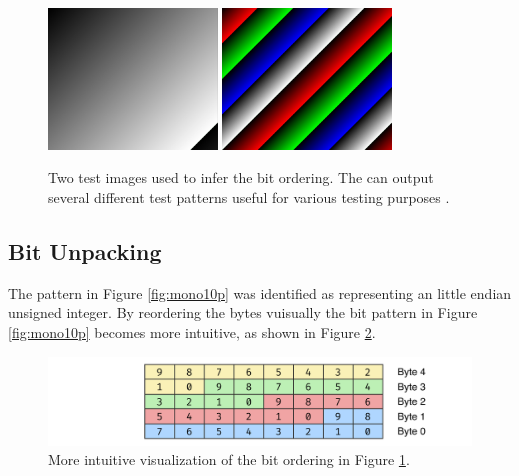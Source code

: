 \begin{figure}[H]
    \centering
    \includegraphics[width=0.4\textwidth]{figures/unpacking/test_pattern0.jpg}
    \includegraphics[width=0.4\textwidth]{figures/unpacking/test_pattern2.jpg}
    \caption{Two test images used to infer the bit ordering.
        The \cam can output several different test patterns useful for various testing purposes \cite{lucidvisionlabsTritonMPPolarized2020}.}
    \label{fig:test_pattern}
\end{figure}


\subsection{Bit Unpacking} \label{sec:contuguous_access}
The pattern in Figure \ref{fig:mono10p} was identified as representing an little endian unsigned integer.
By reordering the bytes vuisually the bit pattern in Figure \ref{fig:mono10p} becomes more intuitive, as shown in Figure \ref{fig:mono10p_reordered}.

\begin{figure}[H]
    \centering
    \includegraphics[width=\textwidth]{figures/unpacking/layout_10p_be.pdf}
    \caption{More intuitive visualization of the bit ordering in Figure \ref{fig:test_pattern}.}
    \label{fig:mono10p_reordered}
\end{figure}

